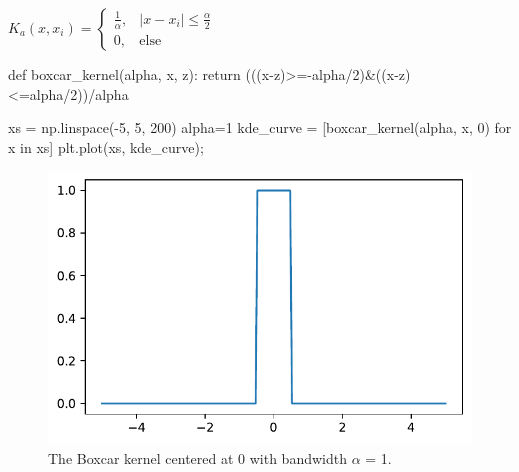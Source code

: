 \documentclass[
  letterpaper,
  DIV=11,
  numbers=noendperiod]{scrreprt}
\newenvironment{Shaded}{\begin{snugshade}}{\end{snugshade}}
\newcommand{\ControlFlowTok}[1]{\textcolor[rgb]{0.00,0.23,0.31}{#1}}
\newcommand{\DecValTok}[1]{\textcolor[rgb]{0.68,0.00,0.00}{#1}}
\newcommand{\KeywordTok}[1]{\textcolor[rgb]{0.00,0.23,0.31}{#1}}
\newcommand{\NormalTok}[1]{\textcolor[rgb]{0.00,0.23,0.31}{#1}}
\newcommand{\OperatorTok}[1]{\textcolor[rgb]{0.37,0.37,0.37}{#1}}
\begin{document}
\(K_a(x, x_i) = \begin{cases}  \frac{1}{\alpha}, & |x - x_i| \le \frac{\alpha}{2}\\  0, & \text{else }  \end{cases}\)

\begin{Shaded}
\begin{Highlighting}[]
\KeywordTok{def}\NormalTok{ boxcar\_kernel(alpha, x, z):}
    \ControlFlowTok{return}\NormalTok{ (((x}\OperatorTok{{-}}\NormalTok{z)}\OperatorTok{\textgreater{}={-}}\NormalTok{alpha}\OperatorTok{/}\DecValTok{2}\NormalTok{)}\OperatorTok{\&}\NormalTok{((x}\OperatorTok{{-}}\NormalTok{z)}\OperatorTok{\textless{}=}\NormalTok{alpha}\OperatorTok{/}\DecValTok{2}\NormalTok{))}\OperatorTok{/}\NormalTok{alpha}

\NormalTok{xs }\OperatorTok{=}\NormalTok{ np.linspace(}\OperatorTok{{-}}\DecValTok{5}\NormalTok{, }\DecValTok{5}\NormalTok{, }\DecValTok{200}\NormalTok{)}
\NormalTok{alpha}\OperatorTok{=}\DecValTok{1}
\NormalTok{kde\_curve }\OperatorTok{=}\NormalTok{ [boxcar\_kernel(alpha, x, }\DecValTok{0}\NormalTok{) }\ControlFlowTok{for}\NormalTok{ x }\KeywordTok{in}\NormalTok{ xs]}
\NormalTok{plt.plot(xs, kde\_curve)}\OperatorTok{;}
\end{Highlighting}
\end{Shaded}

\begin{figure}[H]

{\centering \includegraphics{visualization_2/visualization_2_files/figure-pdf/cell-6-output-1.pdf}

}

\caption{The Boxcar kernel centered at 0 with bandwidth \(\alpha\) = 1.}

\end{figure}
\end{document}
